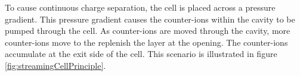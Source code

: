





    To cause continuous charge separation, the cell is placed across a pressure gradient.
    This pressure gradient causes the counter-ions within the cavity to be pumped through the cell.
    As counter-ions are moved through the cavity, more counter-ions move to the replenish the layer at the opening.
    The counter-ions accumulate at the exit side of the cell.
    This scenario is illustrated in figure \ref{fig:streamingCellPrinciple}.

